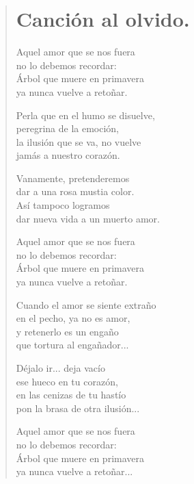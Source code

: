 \documentclass[11pt, portrait, twoside, notitlepage, openright]{book}
\begin{document}
\newpage
\begin{verse}
\begin{center}
\section{Canción al olvido.}
\end{center}
Aquel amor que se nos fuera\\
no lo debemos recordar:\\
Árbol que muere en primavera\\
ya nunca vuelve a  retoñar.
\newline

Perla que en el humo se disuelve,\\
peregrina de la emoción,\\
la ilusión que se va, no vuelve\\
jamás a nuestro corazón.
\newline

Vanamente, pretenderemos\\
dar a una rosa mustia color.\\
Así tampoco logramos\\
dar nueva vida a un muerto amor.
\newline

Aquel amor que se nos fuera\\
no lo debemos recordar:\\
Árbol que muere en primavera\\
ya nunca vuelve a  retoñar.
\newline

Cuando el amor se siente extraño\\
en el pecho, ya no es amor,\\
y retenerlo es un engaño\\
que tortura al engañador...
\newpage

Déjalo ir... deja vacío\\
ese hueco en  tu corazón,\\
en las cenizas de tu hastío\\
pon la brasa de otra ilusión...
\newline

Aquel amor que se nos fuera\\
no lo debemos recordar:\\
Árbol que muere en primavera\\
ya nunca vuelve a retoñar...
\newline


\end{verse}
\end{document}
